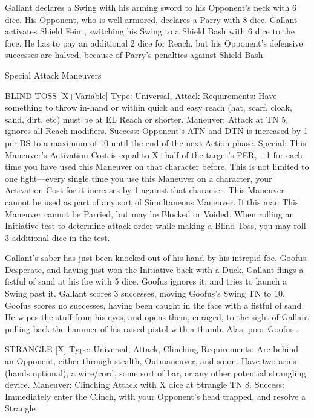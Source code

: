 \documentclass[oneside,11pt,english]{book}
\begin{document}
 

Gallant declares a Swing with his arming sword to his Opponent’s neck with 6 dice. His Opponent, who is well-armored, 
declares a Parry with 8 dice. Gallant activates Shield Feint, switching his Swing to a Shield Bash with 6 dice to the face. He has 
to pay an additional 2 dice for Reach, but his Opponent’s defensive successes are halved, because of Parry’s penalties against 
Shield Bash. 
 

 

Special Attack Maneuvers 

 

BLIND TOSS [X+Variable] 
Type: Universal, Attack 
Requirements: Have something to throw in-hand or within quick and easy reach (hat, scarf, cloak, sand, 
dirt, etc) must be at EL Reach or shorter. 
Maneuver: Attack at TN 5, ignores all Reach modifiers. 
Success: Opponent's ATN and DTN is increased by 1 per BS to a maximum of 10 until the end of the 
next Action phase. 
Special: This Maneuver’s Activation Cost is equal to X+half of the target's PER, +1 for each time you 
have used this Maneuver on that character before. This is not limited to one fight—every single time you 
use this Maneuver on a character, your Activation Cost for it increases by 1 against that character. 
This Maneuver cannot be used as part of any sort of Simultaneous Maneuver. 
If this man 
This Maneuver cannot be Parried, but may be Blocked or Voided. 
When rolling an Initiative test to determine attack order while making a Blind Toss, you may roll 3 
additional dice in the test. 

 

Gallant’s saber has just been knocked out of his hand by his intrepid foe, Goofus. Desperate, and having just won the Initiative 
back with a Duck, Gallant flings a fistful of sand at his foe with 5 dice. Goofus ignores it, and tries to launch a Swing past it. 
Gallant scores 3 successes, moving Goofus’s Swing TN to 10. Goofus scores no successes, having been caught in the face with a 
fistful of sand. He wipes the stuff from his eyes, and opens them, enraged, to the sight of Gallant pulling back the hammer of his 
raised pistol with a thumb. Alas, poor Goofus… 

 

STRANGLE [X] 
Type: Universal, Attack, Clinching 
Requirements: Are behind an Opponent, either through stealth, Outmaneuver, and so on. Have two arms 
(hands optional), a wire/cord, some sort of bar, or any other potential strangling device. 
Maneuver: Clinching Attack with X dice at Strangle TN 8. 
Success: Immediately enter the Clinch, with your Opponent’s head trapped, and resolve a Strangle 
\end{document}

